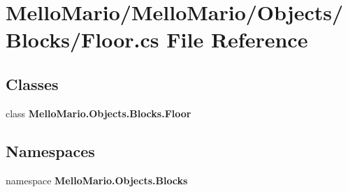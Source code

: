 \section{Mello\+Mario/\+Mello\+Mario/\+Objects/\+Blocks/\+Floor.cs File Reference}
\label{Floor_8cs}
\subsection*{Classes}
\begin{DoxyCompactItemize}
\item 
class \textbf{ Mello\+Mario.\+Objects.\+Blocks.\+Floor}
\end{DoxyCompactItemize}
\subsection*{Namespaces}
\begin{DoxyCompactItemize}
\item 
namespace \textbf{ Mello\+Mario.\+Objects.\+Blocks}
\end{DoxyCompactItemize}

